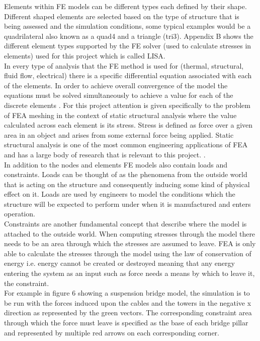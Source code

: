 \noindent
Elements within FE models can be different types each defined by their shape. Different shaped elements are selected based on the type of structure that is being assessed and the simulation conditions, some typical examples would be a quadrilateral also known as a quad4 and a triangle (tri3). Appendix B shows the different element types supported by the FE solver (used to calculate stresses in elements) used for this project which is called LISA. \\ 

\noindent
In every type of analysis that the FE method is used for (thermal, structural, fluid flow, electrical) there is a specific differential equation associated with each of the elements. In order to achieve overall convergence of the model the equations must be solved simultaneously to achieve a value for each of the discrete elements \cite{IntroductionToFE}. For this project attention is given specifically to the problem of FEA meshing in the context of static structural analysis where the value calculated across each element is its stress. Stress is defined as force over a given area in an object and arises from some external force being applied. Static structural analysis is one of the most common engineering applications of FEA and has a large  body of research that is relevant to this project. \cite{DolsakPaper94}\cite{IntroductionToFE}.\\

\noindent
In addition to the nodes and elements FE models also contain loads and constraints. Loads can be thought of as the phenomena from the outside world that is acting on the structure and consequently inducing some kind of physical effect on it. Loads are used by engineers to model the conditions which the structure will be expected to perform under when it is manufactured and enters operation. \\

\noindent
Constraints are another fundamental concept that describe where the model is attached to the outside world. When computing stresses through the model there needs to be an area through which the stresses are assumed to leave. FEA is only able to calculate the stresses through the model using the law of conservation of energy i.e. energy cannot be created or destroyed meaning that any energy entering the system as an input such as force needs a means by which to leave it, the constraint. \\

\noindent
For example in figure 6 showing a suspension bridge model, the simulation is to be run with the forces induced upon the cables and the towers in the negative x direction as represented by the green vectors. The corresponding constraint area through which the force must leave is specified as the base of each bridge pillar and represented by multiple red arrows on each corresponding corner.\\

